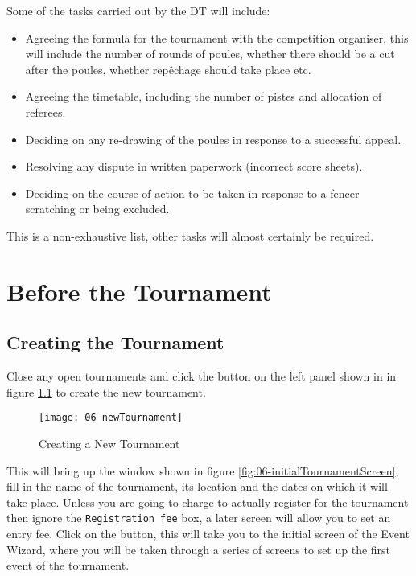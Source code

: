 \documentclass[a4paper,11pt]{memoir}
\begin{document}
Some of the tasks carried out by the DT will include:

\begin{itemize}
 \item Agreeing the formula for the tournament with the competition organiser, this will include the number of rounds of poules, whether there should be a cut after the poules, whether repêchage should take place etc.
 \item Agreeing the timetable, including the number of pistes and allocation of referees.
 \item Deciding on any re-drawing of the poules in response to a successful appeal.
 \item Resolving any dispute in written paperwork (incorrect score sheets).
 \item Deciding on the course of action to be taken in response to a fencer scratching or being excluded.
\end{itemize}

This is a non-exhaustive list, other tasks will almost certainly be required.

\chapter{Before the Tournament}
\section{Creating the Tournament}

Close any open tournaments and click the  button on the left panel shown in in figure \ref{fig:06-newTournament} to create the new tournament.

\begin{figure}
 \centering
 \texttt{[image: 06-newTournament]}
 \caption{Creating a New Tournament} \label{fig:06-newTournament}
\end{figure}

This will bring up the window shown in figure \ref{fig:06-initialTournamentScreen}, fill in the name of the tournament, its location and the dates on which it will take place. Unless you are going to charge to actually register for the tournament then ignore the \texttt{Registration fee} box, a later screen will allow you to set an entry fee. Click on the  button, this will take you to the initial screen of the Event Wizard, where you will be taken through a series of screens to set up the first event of the tournament.
\end{document}
